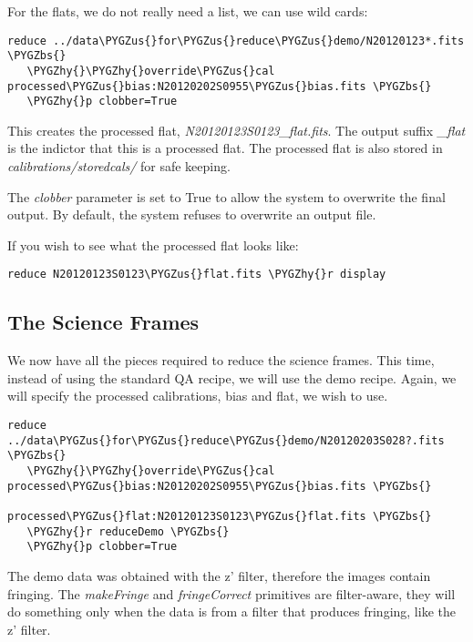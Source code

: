 \documentclass[letterpaper,10pt,english]{sphinxmanual}
\def\PYGZbs{\char`\\}
\def\PYGZus{\char`\_}
\def\PYGZhy{\char`\-}
\begin{document}
For the flats, we do not really need a list, we can use wild cards:

\begin{Verbatim}[commandchars=\\\{\}]
reduce ../data\PYGZus{}for\PYGZus{}reduce\PYGZus{}demo/N20120123*.fits \PYGZbs{}
   \PYGZhy{}\PYGZhy{}override\PYGZus{}cal processed\PYGZus{}bias:N20120202S0955\PYGZus{}bias.fits \PYGZbs{}
   \PYGZhy{}p clobber=True
\end{Verbatim}

This creates the processed flat, \emph{N20120123S0123\_flat.fits}.  The output suffix
\emph{\_flat} is the indictor that this is a processed flat.  The processed flat is also
stored in \emph{calibrations/storedcals/} for safe keeping.

The \emph{clobber} parameter is set to True to allow the system to overwrite the final
output.  By default, the system refuses to overwrite an output file.

If you wish to see what the processed flat looks like:

\begin{Verbatim}[commandchars=\\\{\}]
reduce N20120123S0123\PYGZus{}flat.fits \PYGZhy{}r display
\end{Verbatim}


\subsection{The Science Frames}
\label{appendices/appendix_demo:the-science-frames}
We now have all the pieces required to reduce the science frames.  This time,
instead of using the standard QA recipe, we will use the demo recipe.  Again,
we will specify the processed calibrations, bias and flat, we wish to use.

\begin{Verbatim}[commandchars=\\\{\}]
reduce ../data\PYGZus{}for\PYGZus{}reduce\PYGZus{}demo/N20120203S028?.fits \PYGZbs{}
   \PYGZhy{}\PYGZhy{}override\PYGZus{}cal processed\PYGZus{}bias:N20120202S0955\PYGZus{}bias.fits \PYGZbs{}
                  processed\PYGZus{}flat:N20120123S0123\PYGZus{}flat.fits \PYGZbs{}
   \PYGZhy{}r reduceDemo \PYGZbs{}
   \PYGZhy{}p clobber=True
\end{Verbatim}

The demo data was obtained with the z' filter, therefore the images contain fringing.
The \emph{makeFringe} and \emph{fringeCorrect} primitives are filter-aware, they will do
something only when the data is from a filter that produces fringing, like the z'
filter.
\end{document}
